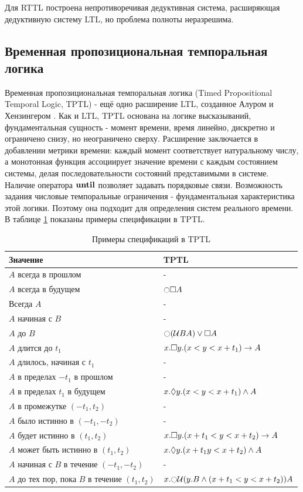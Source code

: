 		Для RTTL построена непротиворечивая дедуктивная система, расширяющая дедуктивную систему LTL, но проблема полноты неразрешима.
		
		\subsection{Временная пропозициональная темпоральная логика}
		Временная пропозициональная темпоральная логика (Timed Propositional Temporal Logic, TPTL) - ещё одно расширение LTL, созданное Алуром и Хензингером \cite{TPTL}.
		Как и LTL, TPTL основана на логике высказываний, фундаментальная сущность - момент времени, время линейно, дискретно и ограничено снизу, но неограничено сверху.
		Расширение заключается в добавлении метрики времени: каждый момент соответствует натуральному числу, а монотонная функция ассоциирует значение времени с каждым состоянием системы, делая последовательности состояний представимыми в системе.
		Наличие оператора $ \text{\textbf{until}} $ позволяет задавать порядковые связи.
		Возможность задания числовые темпоральные ограничения - фундаментальная характеристика этой логики.
		Поэтому она подходит для определения систем реального времени.
		В таблице \ref{table:tptl} показаны примеры спецификации в TPTL.
		
			\begin{table} [htbp]
			\centering
			\caption{Примеры спецификаций в TPTL}
			\label{table:tptl}%
			\begin{tabular}{|l|l|}
				\hline 
				Значение & TPTL \\
				\hline 
				\hline 
				$ A $ всегда в прошлом & - \\ 
				$ A $ всегда в будущем & $ \Next \futureAlways A $ \\ 
				Всегда $ A $ & - \\
				$ A $ начиная с $ B $ & - \\ 
				$ A $ до $ B $ & $ \Next ( \untilShort B A) \lor \futureAlways A $  \\ 
				\hline 
				$ A $ длится до $ t_1 $& $ x.\square y. (x<y<x+t_1) \rightarrow A$ \\ 
				$ A $ длилось, начиная с $ t_1 $ & -  \\ 
				$ A $ в пределах $ -t_1 $ в прошлом & - \\ 
				$ A $ в пределах $ t_1 $ в будущем & $ x.\lozenge y.(x<y<x+t_1)\land A $  \\ 
				\hline 
				$ A $ в промежутке $ (-t_1, t_2) $& - \\ 
				$ A $ было истинно в $ (-t_1,-t_2) $&-  \\ 
				$ A $ будет истинно в $ (t_1,t_2) $& $ x.\square y.(x+t_1<y<x+t_2)\rightarrow A $  \\
				$ A $ может быть истинно в $ (t_1,t_2) $& $ x.\lozenge y.(x+t_1y<x+t_2)\land A $  \\
				\hline
				$ A $ начиная с $ B $ в течение $ (-t_1, -t_2) $ & - \\  
				$ A $ до тех пор, пока $ B $ в течение $ (t_1,t_2) $ & $ x.\Next\untilShort(y.B\land(x+t_1<y<x+t_2))A$ \\ 
				\hline 
			\end{tabular} 
		\end{table}
	
